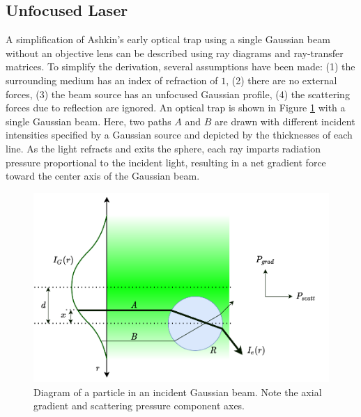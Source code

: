 \documentclass{article}
\begin{document}
	\subsection{Unfocused Laser}
	A simplification of Ashkin's early optical trap using a single Gaussian beam without an objective lens can be described using ray diagrams and ray-transfer matrices. To simplify the derivation, several assumptions have been made: (1) the surrounding medium has an index of refraction of $1$, (2) there are no external forces, (3) the beam source has an unfocused Gaussian profile, (4) the scattering forces due to reflection are ignored. An optical trap is shown in Figure \ref{fig:lens} with a single Gaussian beam. Here, two paths $A$ and $B$ are drawn with different incident intensities specified by a Gaussian source and depicted by the thicknesses of each line. As the light refracts and exits the sphere, each ray imparts radiation pressure proportional to the incident light, resulting in a net gradient force toward the center axis of the Gaussian beam.
	
	\begin{figure}[H]
		\begin{center}
			\includegraphics[width=0.7\linewidth]{lens}
		\end{center}
		\caption{Diagram of a particle in an incident Gaussian beam. Note the axial gradient and scattering pressure component axes.}
		\label{fig:lens}
	\end{figure}
	
	\pagebreak
	
\end{document}
